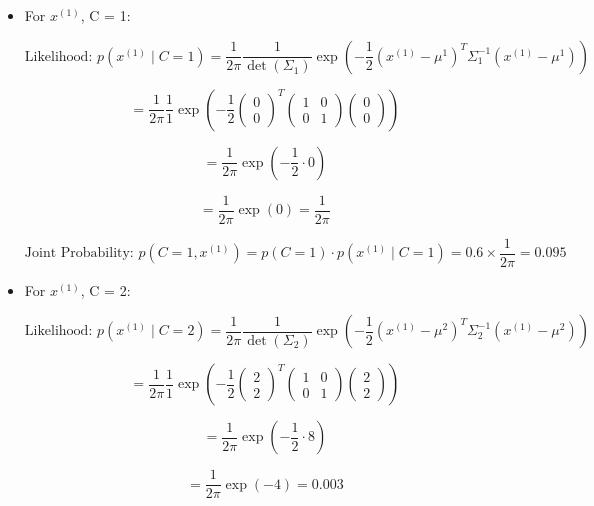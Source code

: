 \documentclass{article}
\begin{document}
\begin{itemize}

 \item[\textbullet] For \( x^{(1)} \), C = 1:
 
\[
\text{Likelihood: } p \left( x^{(1)} \mid C = 1 \right) = \frac{1}{2\pi} \frac{1}{\det(\Sigma_1)} \exp \left( -\frac{1}{2} \left( x^{(1)} - \mu^1 \right)^T \Sigma_1^{-1} \left( x^{(1)} - \mu^1 \right) \right)
\]

\[
= \frac{1}{2\pi} \frac{1}{1} \exp \left( -\frac{1}{2} \begin{pmatrix} 0 \\ 0 \end{pmatrix}^T \begin{pmatrix} 1 & 0 \\ 0 & 1 \end{pmatrix} \begin{pmatrix} 0 \\ 0 \end{pmatrix} \right)
\]

\[
= \frac{1}{2\pi} \exp \left( -\frac{1}{2} \cdot 0 \right) 
\]

\[
= \frac{1}{2\pi} \exp(0) = \frac{1}{2\pi}
\]

\[
\text{Joint Probability: } p(C = 1, x^{(1)}) = p(C = 1) \cdot p(x^{(1)} \mid C = 1) = 0.6 \times \frac{1}{2\pi} = 0.095
\]
\newpage

 \item[\textbullet] For \( x^{(1)} \), C = 2: 
 
\[
\text{Likelihood: } p \left( x^{(1)} \mid C = 2 \right) = \frac{1}{2\pi} \frac{1}{\det(\Sigma_2)} \exp \left( -\frac{1}{2} \left( x^{(1)} - \mu^2 \right)^T \Sigma_2^{-1} \left( x^{(1)} - \mu^2 \right) \right)
\]

\[
= \frac{1}{2\pi} \frac{1}{1} \exp \left( -\frac{1}{2} \begin{pmatrix} 2 \\ 2 \end{pmatrix}^T \begin{pmatrix} 1 & 0 \\ 0 & 1 \end{pmatrix} \begin{pmatrix} 2 \\ 2 \end{pmatrix} \right)
\]

\[
= \frac{1}{2\pi} \exp \left( -\frac{1}{2} \cdot 8 \right) 
\]

\[
= \frac{1}{2\pi} \exp(-4) = 0.003
\]


\end{itemize}
\end{document}
